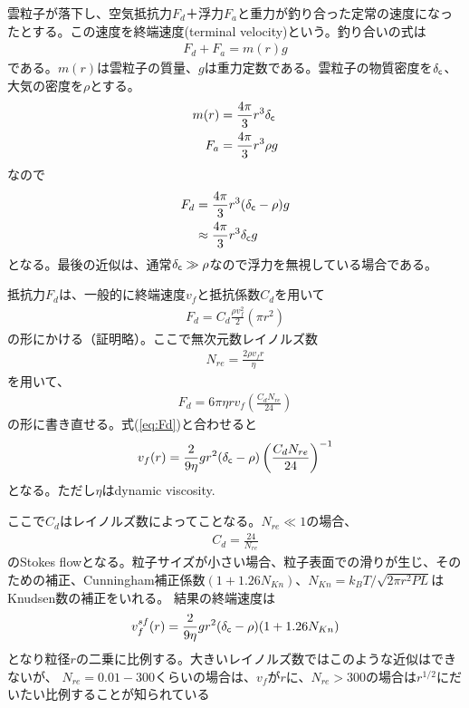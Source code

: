 雲粒子が落下し、空気抵抗力$F_d$＋浮力$F_a$と重力が釣り合った定常の速度になったとする。この速度を終端速度(terminal velocity)という。釣り合いの式は
\begin{align}
F_d + F_a = m (r) g 
\end{align}
である。$m(r)$は雲粒子の質量、$g$は重力定数である。雲粒子の物質密度を$\delta_{\mathsf{c}}$、大気の密度を$\rho$とする。
\begin{align}
m(r) &= \frac{4 \pi}{3} r^3 \delta_{\mathsf{c}} \\
F_a &= \frac{4 \pi}{3} r^3 \rho g 
\end{align}
なので
\begin{align}
\label{eq:Fd}
F_d &= \frac{4 \pi}{3} r^3 (\delta_{\mathsf{c}} - \rho) g \\
&\approx  \frac{4 \pi}{3} r^3 \delta_{\mathsf{c}} g 
\end{align}
となる。最後の近似は、通常$\delta_{\mathsf{c}} \gg \rho$なので浮力を無視している場合である。

抵抗力$F_d$は、一般的に終端速度$v_f$と抵抗係数$C_d$を用いて
\begin{align}
F_d = C_d \frac{\rho v_f^2}{2} (\pi r^2)  
\end{align}
の形にかける（証明略）。ここで無次元数レイノルズ数
\begin{align}
\label{eq:Reynolds}
N_{re} = \frac{2 \rho v_f r}{\eta}
\end{align}
を用いて、
\begin{align}
F_d = 6 \pi \eta r v_f \left( \frac{C_d N_{re}}{24} \right)
\end{align}
の形に書き直せる。式(\ref{eq:Fd})と合わせると
\begin{align}
\label{eq:gcloud}
v_f(r) = \frac{2}{9 \eta}  g r^2 (\delta_{\mathsf{c}} - \rho) \left( \frac{C_d N_{re}}{24} \right)^{-1}
\end{align}
となる。ただし$\eta$はdynamic viscosity.


ここで$C_d$はレイノルズ数によってことなる。$N_{re} \ll 1$の場合、
\begin{align}
C_d = \frac{24}{N_{re}}
\end{align}
のStokes flowとなる。粒子サイズが小さい場合、粒子表面での滑りが生じ、そのための補正、Cunningham補正係数$(1+1.26 N_{Kn})$、$N_{Kn}=k_B T/\sqrt{2 \pi r^2 P L}$はKnudsen数の補正をいれる。
結果の終端速度は
\begin{align}
\label{eq:sfcloud}
v_f^{sf}(r) = \frac{2}{9 \eta} g r^2 (\delta_{\mathsf{c}} - \rho) (1+1.26 N_{Kn})
\end{align}
となり粒径$r$の二乗に比例する。大きいレイノルズ数ではこのような近似はできないが、
$N_{re} = 0.01-300$くらいの場合は、$v_f$が$r$に、$N_{re} > 300$の場合は$r^{1/2}$にだいたい比例することが知られている

